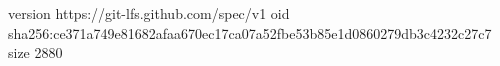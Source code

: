 version https://git-lfs.github.com/spec/v1
oid sha256:ce371a749e81682afaa670ec17ca07a52fbe53b85e1d0860279db3c4232c27c7
size 2880
